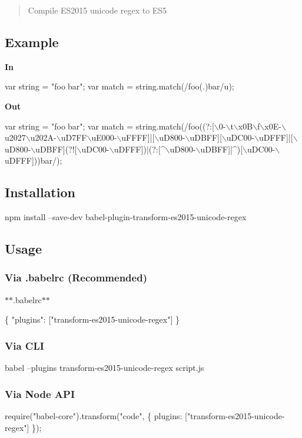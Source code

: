 \begin{quote}
Compile E\+S2015 unicode regex to E\+S5 \end{quote}


\subsection*{Example}

{\bfseries In}


\begin{DoxyCode}
var string = "foo💩bar";
var match = string.match(/foo(.)bar/u);
\end{DoxyCode}


{\bfseries Out}


\begin{DoxyCode}
var string = "foo💩bar";
var match =
       string.match(/foo((?:[\(\backslash\)0-\(\backslash\)t\(\backslash\)x0B\(\backslash\)f\(\backslash\)x0E-\(\backslash\)u2027\(\backslash\)u202A-\(\backslash\)uD7FF\(\backslash\)uE000-\(\backslash\)uFFFF]|[\(\backslash\)uD800-\(\backslash\)uDBFF][\(\backslash\)uDC00-\(\backslash\)uDFFF]|[\(\backslash\)uD800-\(\backslash\)uDBFF](?![\(\backslash\)uDC00-\(\backslash\)uDFFF])|(?:[^\(\backslash\)uD800-\(\backslash\)uDBFF]|^)[\(\backslash\)uDC00-\(\backslash\)uDFFF]))bar/);
\end{DoxyCode}


\subsection*{Installation}


\begin{DoxyCode}
npm install --save-dev babel-plugin-transform-es2015-unicode-regex
\end{DoxyCode}


\subsection*{Usage}

\subsubsection*{Via {\ttfamily .babelrc} (Recommended)}

$\ast$$\ast$.babelrc$\ast$$\ast$


\begin{DoxyCode}
\{
  "plugins": ["transform-es2015-unicode-regex"]
\}
\end{DoxyCode}


\subsubsection*{Via C\+LI}


\begin{DoxyCode}
babel --plugins transform-es2015-unicode-regex script.js
\end{DoxyCode}


\subsubsection*{Via Node A\+PI}


\begin{DoxyCode}
require("babel-core").transform("code", \{
  plugins: ["transform-es2015-unicode-regex"]
\});
\end{DoxyCode}
 